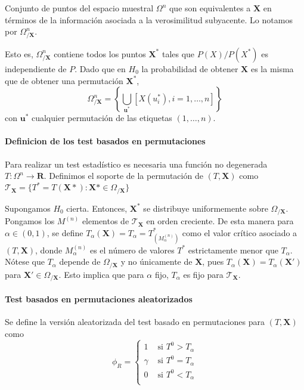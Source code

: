 \begin{definicion}
	Conjunto de puntos del espacio muestral $\Omega^n$ que son equivalentes a $\mathbf{X}$ en términos de la información asociada a la verosimilitud subyacente. Lo notamos por $\Omega^n_{/\mathbf{X}}$.
\end{definicion}

	Esto es, $\Omega^n_{/\mathbf{X}}$ contiene todos los puntos $\mathbf{X}^*$ tales que $P(X)/P(X^*)$ es independiente de $P$. Dado que en $H_0$ la probabilidad de obtener $\mathbf{X}$ es la misma que de obtener una permutación $\mathbf{X}^*$,
	\[ 
		\Omega^n_{/\mathbf{X}} = 
			\left\lbrace
				\underset{\mathbf{u}^*}{\bigcup}
					[ X(u_i^*), i = 1, \dots, n ]
			\right\rbrace
	\]
	con $\mathbf{u}^*$ cualquier permutación de las etiquetas $(1, \dots, n)$.

\paragraph{Definicion de los test basados en permutaciones}
\begin{definicion}
	Para realizar un test estadístico es necesaria una función no degenerada $T: \Omega^n \rightarrow \mathbf{R}$. Definimos el soporte de la permutación de $(T, \mathbf{X})$ como $\mathcal{T}_\mathbf{X} = \{ T^* = T(\mathbf{X}*): \mathbf{X}* \in \Omega_{/\mathbf{X}}\}$ 
\end{definicion}	

	Supongamos $H_0$ cierta. Entonces, $\mathbf{X}^*$ se distribuye uniformemente sobre $\Omega_{/\mathbf{X}}$. Pongamos los $M^{(n)}$ elementos de $\mathcal{T}_\mathbf{X}$ en orden creciente. De esta manera para $\alpha \in (0,1)$, se define $T_\alpha(\mathbf{X}) = T_\alpha = T^*_{(M^{(n)}_\alpha)}$ como el valor crítico asociado a $(T, \mathbf{X})$, donde $M^{(n)}_\alpha$ es el número de valores $T^*$ estrictamente menor que $T_\alpha$. Nótese que $T_\alpha$ depende de $\Omega_{/\mathbf{X}}$ y no únicamente de $\mathbf{X}$, pues $T_\alpha(\mathbf{X}) = T_\alpha(\mathbf{X}')$ para $\mathbf{X}' \in \Omega_{/\mathbf{X}}$. Esto implica que para $\alpha$ fijo, $T_\alpha$ es fijo para $\mathcal{T}_\mathbf{X}$.
	
\paragraph{Test basados en permutaciones aleatorizados}

	Se define la versión aleatorizada del test basado en permutaciones para $(T, \mathbf{X})$ como 
	\[ 
		\phi_R = \left\lbrace \begin{array}{cc}
			1 		& \text{ si } T^0 > T_\alpha \\
			\gamma 	& \text{ si } T^0 = T_\alpha \\
			0		& \text{ si } T^0 < T_\alpha \\
		\end{array} \right.
	\]
	
